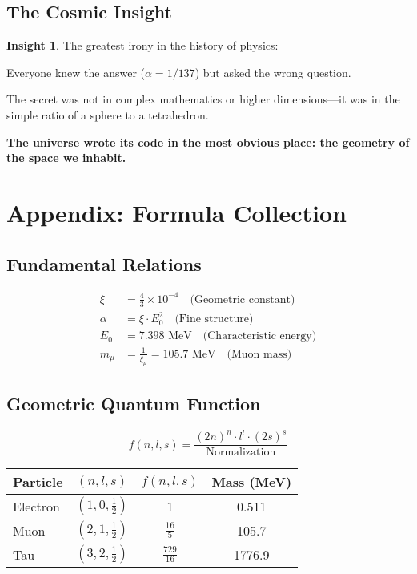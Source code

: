 \documentclass[12pt,a4paper]{article}
\theoremstyle{definition}
\newtheorem{insight}{Insight}[section]
\begin{document}
	\subsection{The Cosmic Insight}
	
	\begin{insight}
		The greatest irony in the history of physics:
		
		Everyone knew the answer ($\alpha = 1/137$) but asked the wrong question.
		
		The secret was not in complex mathematics or higher dimensions---it was in the simple ratio of a sphere to a tetrahedron.
		
		\textbf{The universe wrote its code in the most obvious place: the geometry of the space we inhabit.}
	\end{insight}
	
	\newpage
	\section{Appendix: Formula Collection}
	
	\subsection{Fundamental Relations}
	
	\begin{align}
		\xi &= \frac{4}{3} \times 10^{-4} \quad \text{(Geometric constant)}\\
		\alpha &= \xi \cdot E_0^2 \quad \text{(Fine structure)}\\
		E_0 &= 7.398 \text{ MeV} \quad \text{(Characteristic energy)}\\
		m_\mu &= \frac{1}{\xi_\mu} = 105.7 \text{ MeV} \quad \text{(Muon mass)}
	\end{align}
	
	\subsection{Geometric Quantum Function}
	
	\begin{equation}
		f(n,l,s) = \frac{(2n)^n \cdot l^l \cdot (2s)^s}{\text{Normalization}}
	\end{equation}
	
	\begin{center}
		\begin{tabular}{lccc}
			\toprule
			Particle & $(n,l,s)$ & $f(n,l,s)$ & Mass (MeV)\\
			\midrule
			Electron & $(1,0,\frac{1}{2})$ & 1 & 0.511\\
			Muon & $(2,1,\frac{1}{2})$ & $\frac{16}{5}$ & 105.7\\
			Tau & $(3,2,\frac{1}{2})$ & $\frac{729}{16}$ & 1776.9\\
			\bottomrule
		\end{tabular}
	\end{center}
	
\end{document}
